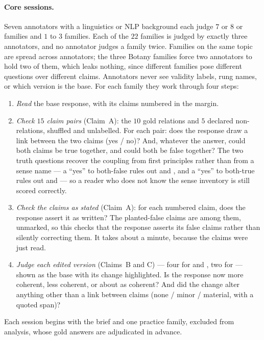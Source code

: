 \paragraph{Core sessions.} Seven annotators with a linguistics or NLP background each judge $7$ or $8$
 or  families and $1$ to $3$  families. Each of the $22$ families
is judged by exactly three annotators, and no annotator judges a family twice. Families on the same topic are spread
across annotators; the three Botany families force two annotators to hold two of them, which leaks nothing, since
different families pose different questions over different claims. Annotators never see validity labels, rung
names, or which version is the base. For each family they work through four steps:
\begin{enumerate}[leftmargin=1.4em,itemsep=1pt,topsep=2pt]
\item \emph{Read} the base response, with its claims numbered in the margin.
\item \emph{Check $15$ claim pairs} (Claim~A): the $10$ gold relations and $5$ declared non-relations, shuffled
  and unlabelled. For each pair: does the response draw a link between the two claims (yes / no)? And, whatever the
  answer, could both claims be true together, and could both be false together? The two truth questions recover the
  coupling from first principles rather than from a sense name --- a ``yes'' to both-false rules out \exc{} and
  \cnc{}, and a ``yes'' to both-true rules out \con{} and \exc{} --- so a reader
  who does not know the sense inventory is still scored correctly.
\item \emph{Check the claims as stated} (Claim~A): for each numbered claim, does the response assert it as
  written? The planted-false claims are among them, unmarked, so this checks that the response asserts its false
  claims rather than silently correcting them. It takes about a minute, because the claims were just read.
\item \emph{Judge each edited version} (Claims~B and C) --- four for  and , two
  for  --- shown as the base with its change highlighted. Is the response now more coherent, less
  coherent, or about as coherent? And did the change alter anything other than a link between claims (none /
  minor / material, with a quoted span)?
\end{enumerate}
Each session begins with the brief and one practice family, excluded from analysis, whose gold answers are
adjudicated in advance.

